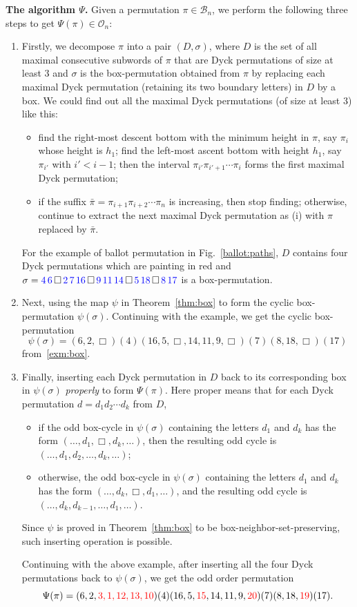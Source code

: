 \documentclass[12pt]{amsart}
\numberwithin{equation}{section}
\def\blue{\textcolor{blue}}
\def\red{\textcolor{red}}
\theoremstyle{plain}
\theoremstyle{definition}
\newcommand{\B}{\mathcal{B}}
\newcommand{\Od}{\mathcal{O}}
\begin{document}
{\bf The algorithm $\Psi$.} Given a permutation $\pi\in\B_n$, we perform the following three steps to get $\Psi(\pi)\in\Od_n$:
\begin{enumerate}
\item Firstly, we  decompose $\pi$ into a pair $(D,\sigma)$, where $D$ is the set of all maximal consecutive subwords of $\pi$ that are Dyck permutations of size at least $3$ and $\sigma$ is the box-permutation obtained from $\pi$ by replacing each maximal Dyck permutation (retaining its two boundary letters)  in $D$ by a box. We could find out all the maximal Dyck permutations (of size at least $3$) like this:
\begin{itemize}
\item[(i)] find the right-most descent bottom with the minimum height in $\pi$, say $\pi_i$ whose height is $h_1$; find the left-most ascent bottom with height $h_1$, say $\pi_{i'}$ with $i'<i-1$; then the interval $\pi_{i'}\pi_{i'+1}\cdots\pi_i$ forms the first maximal Dyck permutation;
\item[(ii)] if the suffix $\bar\pi=\pi_{i+1}\pi_{i+2}\cdots\pi_n$ is increasing, then stop finding; otherwise, continue to extract the next maximal Dyck permutation as (i) with $\pi$ replaced by  $\bar\pi$. 
\end{itemize}

 For the example of  ballot permutation in Fig.~\ref{ballot:paths}, $D$ contains four Dyck permutations which are painting in red and $\sigma=\blue{4\,6}\,\Box\,\blue{2\,7\,16}\,\Box\,\blue{9\,11\,14}\,\Box\,\blue{5\,18}\,\Box\blue{\,8\,17}$ is a box-permutation. 
\item Next, using the map $\psi$ in Theorem~\ref{thm:box} to form the cyclic box-permutation $\psi(\sigma)$. 
Continuing with the example, we get the cyclic box-permutation
$$
\psi(\sigma)=(6,2,\Box)(4)(16,5,\Box,14,11,9,\Box)(7)(8,18,\Box)(17)
$$
 from~\eqref{exm:box}. 
 \item Finally, inserting each Dyck permutation in $D$ back to its corresponding box in $\psi(\sigma)$ {\em properly} to form  $\Psi(\pi)$. Here proper means that for each Dyck permutation $d=d_1d_2\cdots d_k$ from $D$, 
 \begin{itemize}
 \item if the odd box-cycle  in $\psi(\sigma)$ containing the letters $d_1$ and $d_k$ has the form $(\ldots,d_1,\Box,d_k,\ldots)$, then the resulting odd cycle is $(\ldots,d_1,d_2,\ldots,d_k,\ldots)$;
 \item otherwise, the odd box-cycle  in $\psi(\sigma)$ containing the letters $d_1$ and $d_k$ has the form $(\ldots,d_k,\Box,d_1,\ldots)$, and the resulting odd cycle is $(\ldots,d_k,d_{k-1},\ldots,d_1,\ldots)$.
 \end{itemize}
 Since $\psi$ is proved in  Theorem~\ref{thm:box} to be box-neighbor-set-preserving, such inserting operation is possible. 
 
 Continuing with the above example, after inserting all the four Dyck permutations back to $\psi(\sigma)$, we get the odd order permutation
 $$
 \Psi(\pi)=(6,2,\red{3,1,12,13,10})(4)(16,5,\red{15},14,11,9,\red{20})(7)(8,18,\red{19})(17). 
 $$
 \end{enumerate}
\end{document}

